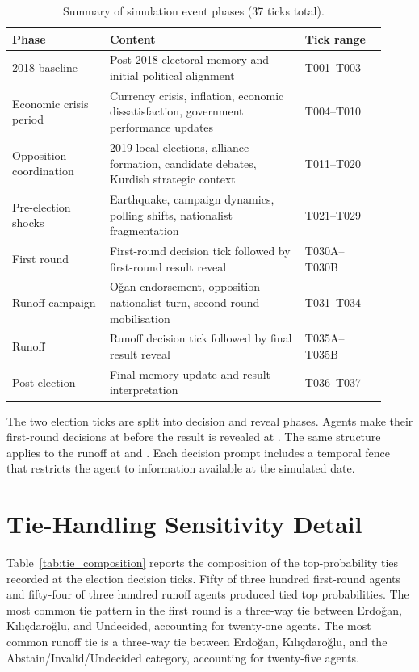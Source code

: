 \documentclass[12pt,a4paper]{report}
\begin{document}
\begin{table}[!ht]
\caption{Summary of simulation event phases (37 ticks total).}
\label{tab:event_phases}
\centering
\footnotesize
\begin{tabular}{@{}p{0.24\linewidth}p{0.48\linewidth}p{0.20\linewidth}@{}}
\toprule
Phase & Content & Tick range \\
\midrule
2018 baseline           & Post-2018 electoral memory and initial political alignment & T001--T003 \\
Economic crisis period  & Currency crisis, inflation, economic dissatisfaction, government performance updates & T004--T010 \\
Opposition coordination & 2019 local elections, alliance formation, candidate debates, Kurdish strategic context & T011--T020 \\
Pre-election shocks     & Earthquake, campaign dynamics, polling shifts, nationalist fragmentation & T021--T029 \\
First round             & First-round decision tick followed by first-round result reveal & T030A--T030B \\
Runoff campaign         & Oğan endorsement, opposition nationalist turn, second-round mobilisation & T031--T034 \\
Runoff                  & Runoff decision tick followed by final result reveal & T035A--T035B \\
Post-election           & Final memory update and result interpretation & T036--T037 \\
\bottomrule
\end{tabular}
\end{table}

The two election ticks are split into decision and reveal phases. Agents make their first-round decisions at  before the result is revealed at . The same structure applies to the runoff at  and . Each decision prompt includes a temporal fence that restricts the agent to information available at the simulated date.

\chapter{Tie-Handling Sensitivity Detail}
\label{app:tie_detail}

Table~\ref{tab:tie_composition} reports the composition of the top-probability ties recorded at the election decision ticks. Fifty of three hundred first-round agents and fifty-four of three hundred runoff agents produced tied top probabilities. The most common tie pattern in the first round is a three-way tie between Erdoğan, Kılıçdaroğlu, and Undecided, accounting for twenty-one agents. The most common runoff tie is a three-way tie between Erdoğan, Kılıçdaroğlu, and the Abstain/Invalid/Undecided category, accounting for twenty-five agents.
\end{document}
